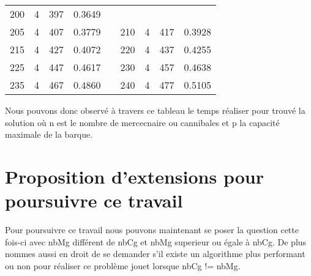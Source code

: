 \documentclass[a4paper, 12pt, french,oneside]{book}
\begin{document}
\begin{table}[!ht]
\begin{tabularx}{\linewidth}{|c|c|c|c|X|c|c|c|c|}
        200          & 4            & 397             & 0.3649                                                                                                           \\

        205          & 4            & 407             & 0.3779                        &  &

        210          & 4            & 417             & 0.3928                                                                                                           \\

        215          & 4            & 427             & 0.4072                        &  &

        220          & 4            & 437             & 0.4255                                                                                                           \\

        225          & 4            & 447             & 0.4617                        &  &

        230          & 4            & 457             & 0.4638                                                                                                           \\

        235          & 4            & 467             & 0.4860                        &  &

        240          & 4            & 477             & 0.5105                                                                                                           \\
        \cline{1-4}\cline{6-9}
    \end{tabularx}
\end{table}
Nous pouvons donc observé à travers ce tableau le temps réaliser pour trouvé la solution où n est le nombre de mercecnaire ou cannibales et p la capacité maximale de la barque.

\chapter{Proposition d'extensions pour poursuivre ce travail}
Pour poursuivre ce travail nous pouvons maintenant se poser la question cette fois-ci avec nbMg différent de nbCg et nbMg superieur ou égale à nbCg. De plus nommes aussi en droit de se demander s'il existe un algorithme plus performant ou non pour réaliser ce problème jouet lorsque nbCg != nbMg.
\end{document}
